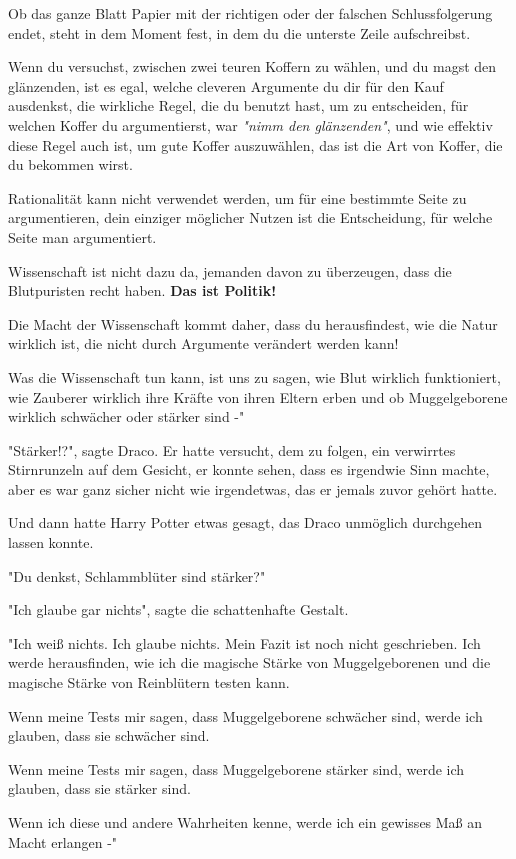 {Ob das ganze Blatt Papier mit der richtigen oder der falschen Schlussfolgerung endet, steht in dem Moment fest, in dem du die unterste Zeile aufschreibst.

Wenn du versuchst, zwischen zwei teuren Koffern zu wählen, und du magst den glänzenden, ist es egal, welche cleveren Argumente du dir für den Kauf ausdenkst, die wirkliche Regel, die du benutzt hast, um zu entscheiden, für welchen Koffer du argumentierst, war \emph{"nimm den glänzenden"}, und wie effektiv diese Regel auch ist, um gute Koffer auszuwählen, das ist die Art von Koffer, die du bekommen wirst.

Rationalität kann nicht verwendet werden, um für eine bestimmte Seite zu argumentieren, dein einziger möglicher Nutzen ist die Entscheidung, für welche Seite man argumentiert.

Wissenschaft ist nicht dazu da, jemanden davon zu überzeugen, dass die Blutpuristen recht haben. \textbf{Das ist Politik!}

Die Macht der Wissenschaft kommt daher, dass du herausfindest, wie die Natur wirklich ist, die nicht durch Argumente verändert werden kann!

Was die Wissenschaft tun kann, ist uns zu sagen, wie Blut wirklich funktioniert, wie Zauberer wirklich ihre Kräfte von ihren Eltern erben und ob Muggelgeborene wirklich schwächer oder stärker sind -"

"Stärker!?", sagte Draco. Er hatte versucht, dem zu folgen, ein verwirrtes Stirnrunzeln auf dem Gesicht, er konnte sehen, dass es irgendwie Sinn machte, aber es war ganz sicher nicht wie irgendetwas, das er jemals zuvor gehört hatte.

Und dann hatte Harry Potter etwas gesagt, das Draco unmöglich durchgehen lassen konnte.

"Du denkst, Schlammblüter sind stärker?"

"Ich glaube gar nichts", sagte die schattenhafte Gestalt.

"Ich weiß nichts. Ich glaube nichts. Mein Fazit ist noch nicht geschrieben. Ich werde herausfinden, wie ich die magische Stärke von Muggelgeborenen und die magische Stärke von Reinblütern testen kann.

Wenn meine Tests mir sagen, dass Muggelgeborene schwächer sind, werde ich glauben, dass sie schwächer sind.

Wenn meine Tests mir sagen, dass Muggelgeborene stärker sind, werde ich glauben, dass sie stärker sind.

Wenn ich diese und andere Wahrheiten kenne, werde ich ein gewisses Maß an Macht erlangen -"

}

